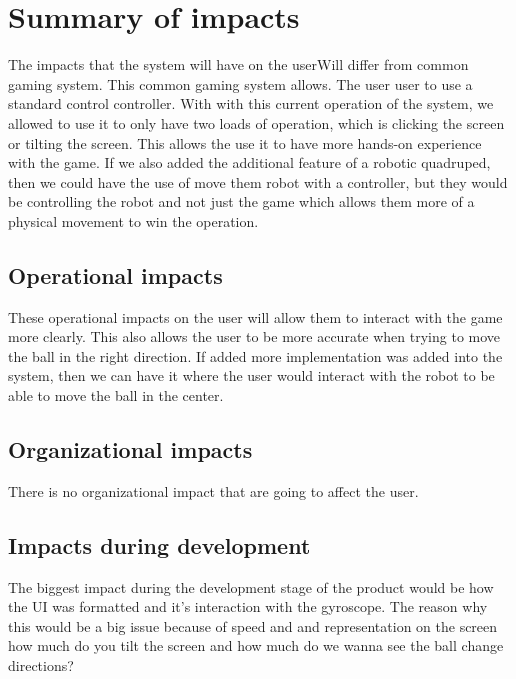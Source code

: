 
\chapter{Summary of impacts}
\label{loc:Summary of impacts}
% 

The impacts that the system will have on the userWill differ from common gaming system. This common gaming system allows. The user user to use a standard control controller. With with this current operation of the system, we allowed to use it to only have two loads of operation, which is clicking the screen or tilting the screen. This allows the use it to have more hands-on experience with the game. If we also added the additional feature of a robotic quadruped, then we could have the use of move them robot with a controller, but they would be controlling the robot and not just the game which allows them more of a physical movement to win the operation.
\section{Operational impacts}
\label{loc:Operational impacts}
% 

These operational impacts on the user will allow them to interact with the game more clearly. This also allows the user to be more accurate when trying to move the ball in the right direction. If added more implementation was added into the system, then we can have it where the user would interact with the robot to be able to move the ball in the center.

\section{Organizational impacts}
\label{loc:Organizational impacts}
% 

There is no organizational impact that are going to affect the user.

\section{Impacts during development}
\label{loc:Impacts during development}
% 

The biggest impact during the development stage of the product would be how the UI was formatted and it's interaction with the gyroscope. The reason why this would be a big issue because of speed and and representation on the screen how much do you tilt the screen and how much do we wanna see the ball change directions?